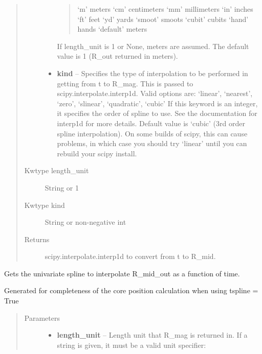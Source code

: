\documentclass[letterpaper,10pt,english]{sphinxmanual}
\begin{document}
\begin{fulllineitems}
\begin{fulllineitems}
\begin{quote}
\begin{description}
\begin{itemize}
\begin{quote}
`m'         meters
`cm'        centimeters
`mm'        millimeters
`in'        inches
`ft'        feet
`yd'        yards
`smoot'     smoots
`cubit'     cubits
`hand'      hands
`default'   meters
\end{quote}

If length\_unit is 1 or None, meters are assumed. The default
value is 1 (R\_out returned in meters).


\item {} 
\textbf{kind} -- Specifies the type of interpolation
to be performed in getting from t to R\_mag. This is
passed to scipy.interpolate.interp1d. Valid options are:
`linear', `nearest', `zero', `slinear', `quadratic', `cubic'
If this keyword is an integer, it specifies the order of spline
to use. See the documentation for interp1d for more details.
Default value is `cubic' (3rd order spline interpolation). On
some builds of scipy, this can cause problems, in which case
you should try `linear' until you can rebuild your scipy install.

\end{itemize}

\item[{Kwtype length\_unit}] \leavevmode
String or 1

\item[{Kwtype kind}] \leavevmode
String or non-negative int

\item[{Returns}] \leavevmode
scipy.interpolate.interp1d to convert from t to R\_mid.

\end{description}\end{quote}

\end{fulllineitems}


\begin{fulllineitems}
\label{eqtools:eqtools.core.Equilibrium.getRmidOutSpline}
Gets the univariate spline to interpolate R\_mid\_out as a function of time.

Generated for completeness of the core position calculation when using
tspline = True
\begin{quote}\begin{description}
\item[{Parameters}] \leavevmode\begin{itemize}
\item {} 
\textbf{length\_unit} -- 
Length unit that R\_mag is returned in. If
a string is given, it must be a valid unit specifier:
\begin{quote}


\end{quote}
\end{itemize}
\end{description}
\end{quote}
\end{fulllineitems}
\end{fulllineitems}
\end{document}
